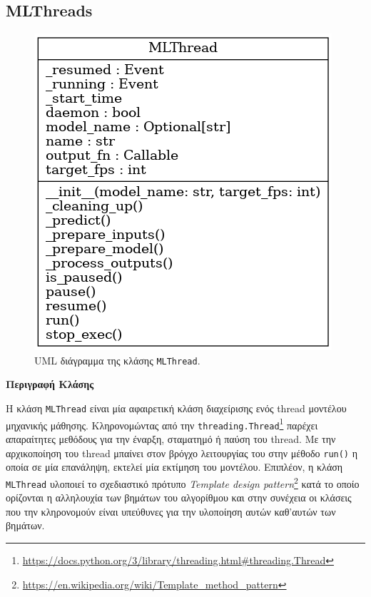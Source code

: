 \newpage
\subsection{MLThreads}
\label{sec:ml_threads}

\begin{figure}[H]
	\centering
	\includegraphics[scale=0.5]{images/chapter5/mlthread_uml.png}
	\caption{UML διάγραμμα της κλάσης \texttt{MLThread}.}
	\label{fig:mlthread}
\end{figure}

\noindent\textbf{Περιγραφή Κλάσης}

Η κλάση \texttt{MLThread} είναι μία αφαιρετική κλάση διαχείρισης ενός thread μοντέλου μηχανικής μάθησης. Κληρονομώντας από την \texttt{threading.Thread}\footnote{\href{https://docs.python.org/3/library/threading.html\#threading.Thread}{https://docs.python.org/3/library/threading.html\#threading.Thread}} παρέχει απαραίτητες μεθόδους για την έναρξη, σταματημό ή παύση του thread. Με την αρχικοποίηση του thread μπαίνει στον βρόγχο λειτουργίας του στην μέθοδο \texttt{run()} η οποία σε μία επανάληψη, εκτελεί μία εκτίμηση του μοντέλου. Επιπλέον, η κλάση \texttt{MLThread} υλοποιεί το σχεδιαστικό πρότυπο \textsl{Template design pattern}\footnote{\href{https://en.wikipedia.org/wiki/Template\_method\_pattern}{https://en.wikipedia.org/wiki/Template\_method\_pattern}} κατά το οποίο ορίζονται η αλληλουχία των βημάτων του αλγορίθμου και στην συνέχεια οι κλάσεις που την κληρονομούν είναι υπεύθυνες για την υλοποίηση αυτών καθ'αυτών των βημάτων.

